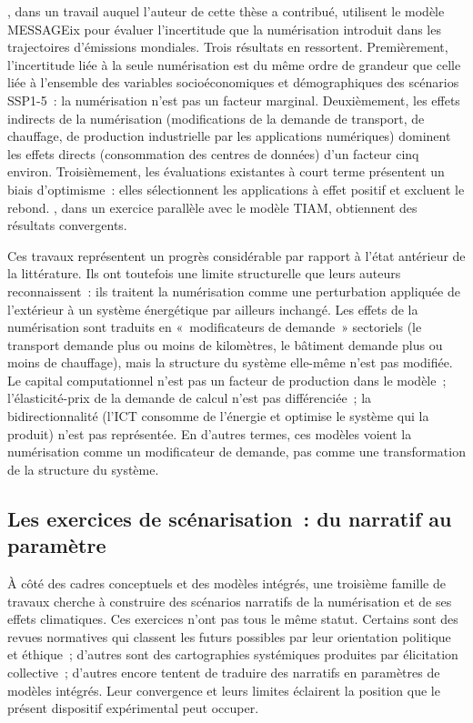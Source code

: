 \textcite{wilson_impacts_2026}, dans un travail auquel l'auteur de cette thèse a contribué, utilisent le modèle MESSAGEix pour évaluer l'incertitude que la numérisation introduit dans les trajectoires d'émissions mondiales. Trois résultats en ressortent. Premièrement, l'incertitude liée à la seule numérisation est du même ordre de grandeur que celle liée à l'ensemble des variables socioéconomiques et démographiques des scénarios SSP1-5~: la numérisation n'est pas un facteur marginal. Deuxièmement, les effets indirects de la numérisation (modifications de la demande de transport, de chauffage, de production industrielle par les applications numériques) dominent les effets directs (consommation des centres de données) d'un facteur cinq environ. Troisièmement, les évaluations existantes à court terme présentent un biais d'optimisme~: elles sélectionnent les applications à effet positif et excluent le rebond. \textcite{beath_impacts_2026}, dans un exercice parallèle avec le modèle TIAM, obtiennent des résultats convergents.

Ces travaux représentent un progrès considérable par rapport à l'état antérieur de la littérature. Ils ont toutefois une limite structurelle que leurs auteurs reconnaissent~: ils traitent la numérisation comme une perturbation appliquée de l'extérieur à un système énergétique par ailleurs inchangé. Les effets de la numérisation sont traduits en «~modificateurs de demande~» sectoriels (le transport demande plus ou moins de kilomètres, le bâtiment demande plus ou moins de chauffage), mais la structure du système elle-même n'est pas modifiée. Le capital computationnel n'est pas un facteur de production dans le modèle~; l'élasticité-prix de la demande de calcul n'est pas différenciée~; la bidirectionnalité (l'ICT consomme de l'énergie et optimise le système qui la produit) n'est pas représentée. En d'autres termes, ces modèles voient la numérisation comme un modificateur de demande, pas comme une transformation de la structure du système.


\subsection{Les exercices de scénarisation~: du narratif au paramètre}\label{subsec:scenarisation}

À côté des cadres conceptuels et des modèles intégrés, une troisième famille de travaux cherche à construire des scénarios narratifs de la numérisation et de ses effets climatiques. Ces exercices n'ont pas tous le même statut. Certains sont des revues normatives qui classent les futurs possibles par leur orientation politique et éthique~; d'autres sont des cartographies systémiques produites par élicitation collective~; d'autres encore tentent de traduire des narratifs en paramètres de modèles intégrés. Leur convergence et leurs limites éclairent la position que le présent dispositif expérimental peut occuper.

